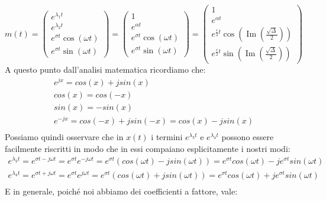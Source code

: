 \begin{displaymath}
m(t)=\left(\begin{array}{c}
e^{\lambda_{1}t}\\
e^{\lambda_{2}t}\\
e^{\sigma t}\cos(\omega t)\\
e^{\sigma t}\sin(\omega t)
\end{array}\right)=\left(\begin{array}{c}
1 \\
e^{\alpha t} \\
e^{\sigma t}\cos(\omega t)\\
e^{\sigma t}\sin(\omega t)
\end{array}\right)
=\left(\begin{array}{c}
1\\
e^{\alpha t} \\
e^{\frac{\varepsilon}{2}t}\cos(\operatorname{Im}(\frac{\sqrt{\Delta}}{2}))\\
e^{\frac{\varepsilon}{2}t}\sin(\operatorname{Im}(\frac{\sqrt{\Delta}}{2}))
\end{array}\right)
\end{displaymath}
A questo punto dall'analisi matematica ricordiamo che: 
\begin{displaymath}
\begin{array}{c}
e^{jx}=cos(x)+jsin(x) \\
cos(x)=cos(-x) \\
sin(x)=-sin(x) \\
e^{-jx}=cos(-x)+jsin(-x)=cos(x)-jsin(x) \\
\end{array}
\end{displaymath}
Possiamo quindi osservare che in $x(t)$ i termini $e^{\lambda_{3}t}$ e $e^{\lambda_{4}t}$ possono essere facilmente riscritti in modo che in essi compaiano esplicitamente i nostri modi:
\begin{displaymath}
\begin{array}{c}
e^{\lambda_{3}t}=e^{\sigma t-j\omega t}=e^{\sigma t}e^{-j\omega t}=e^{\sigma t}(cos(\omega t)-jsin(\omega t))=e^{\sigma t}cos(\omega t)-je^{\sigma t}sin(\omega t) \\
e^{\lambda_{4}t}=e^{\sigma t+j\omega t}=e^{\sigma t}e^{j\omega t}=e^{\sigma t}(cos(\omega t)+jsin(\omega t))=e^{\sigma t}cos(\omega t)+je^{\sigma t}sin(\omega t) \\
\end{array}
\end{displaymath}
E in generale, poiché noi abbiamo dei coefficienti a fattore, vale:
